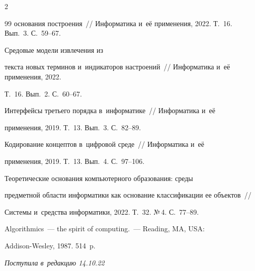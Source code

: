 \begin{multicols}{2}
{{\begin{thebibliography}{99}
основания построения~// Информатика и~её применения, 2022. Т.~16. Вып.~3. С.~59--67.


 Средовые модели извлечения из 

текста новых терминов и~индикаторов настроений~// Информатика и~её применения, 2022. 

Т.~16. Вып.~2. С.~60--67.


 Интерфейсы третьего порядка в~информатике~// Информатика и~её 

применения, 2019. Т.~13. Вып.~3. С.~82--89.


 Кодирование концептов в~цифровой среде~// Информатика и~её 

применения, 2019. Т.~13. Вып.~4. С.~97--106.


 Теоретические основания компьютерного образования: среды 

предметной области информатики как основание классификации ее объектов~//  

Сис\-те\-мы и~средства информатики, 2022. Т.~32. №\,4. С.~77--89.


 Algorithmics~--- the spirit of computing.~--- Reading, MA, USA:  

Addison-Wesley, 1987. 514~p.

\end{thebibliography}



 }

 }



\end{multicols}



\vspace*{-6pt}



\hfill{\small\textit{Поступила в~редакцию 14.10.22}}



\vspace*{8pt}









